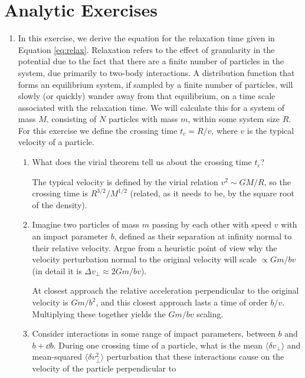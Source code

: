 \section{Analytic Exercises}

\begin{enumerate}
\item In this exercise, we derive the equation for the relaxation time
given in Equation \ref{eq:relax}. Relaxation refers to the effect of
granularity in the potential due to the fact that there are a finite
number of particles in the system, due primarily to two-body
interactions. A distribution function that forms an equilibrium
system, if sampled by a finite number of particles, will slowly (or
quickly) wander away from that equilibrium, on a time scale associated
with the relaxation time. We will calculate this for a system of mass
$M$, consisting of $N$ particles with mass $m$, within some system
size $R$. For this exercise we define the crossing time $t_c=R/v$,
where $v$ is the typical velocity of a particle.
\begin{enumerate}
\item What does the virial theorem tell us about the crossing time
$t_c$?
\begin{answer}
The typical velocity is defined by the virial relation $v^2\sim GM/R$,
so the crossing time is $R^{3/2}/M^{1/2}$ (related, as it needs to be,
by the square root of the density).
\end{answer}
\item \label{q:deflection}
Imagine two particles of mass $m$ passing by each other with
speed $v$ with an impact parameter $b$, defined as their separation at
infinity normal to their relative velocity. Argue from a heuristic
point of view why the velocity perturbation normal to the original
velocity will scale $\propto Gm/bv$ (in detail it is $\Delta
v_\perp \approx 2Gm/bv$).
\begin{answer}
At closest approach the relative acceleration perpendicular to the
original velocity is $Gm/b^2$, and this closest approach lasts a time
of order $b/v$. Multiplying these together yields the $Gm/bv$ scaling.
\end{answer}
\item Consider interactions in some range of impact parameters,
between $b$ and $b+\dd{b}$. During one crossing time of a particle,
what is the mean $\langle \delta v_\perp\rangle$ and mean-squared
$\langle \delta v_\perp^2\rangle$ perturbation that these
interactions cause on the velocity of the particle perpendicular to

\end{enumerate}
\end{enumerate}
